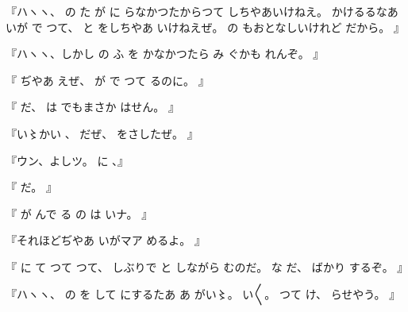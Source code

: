 『ハヽヽ、
の
た
が
に
らなかつたからつて
しちやあいけねえ。
かけるるなあ
いが
で
つて、
と
をしちやあ
いけねえぜ。
の
もおとなしいけれど
だから。
』

『ハヽヽ、しかし
の
ふ
を
かなかつたら
み
ぐかも
れんぞ。
』

『
ぢやあ
えぜ、
が
で
つて
るのに。
』

『
だ、
は
でもまさか
はせん。
』

『い〻かい
、
だぜ、
をさしたぜ。
』

『ウン、よしツ。
に
、』

『
だ。
』

『
が
んで
る
の
は
いナ。
』

『それほどぢやあ
いがマア
めるよ。
』

『
に
て
つて
つて、
しぶりで
と
しながら
むのだ。
な
だ、
ばかり
するぞ。
』

『ハヽヽ、
の
を
して
にするたあ
あ
がい〻。
い〳〵。
つて
け、
らせやう。%
』
